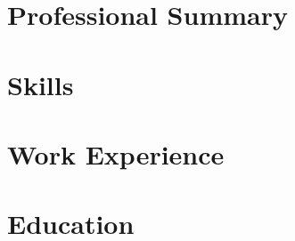 \documentclass[a4paper,10pt]{article}
\begin{document}
\section{Professional Summary}


\section{Skills}
\vspace{0.2em}


\section{Work Experience}



\section{Education}

\end{document}

